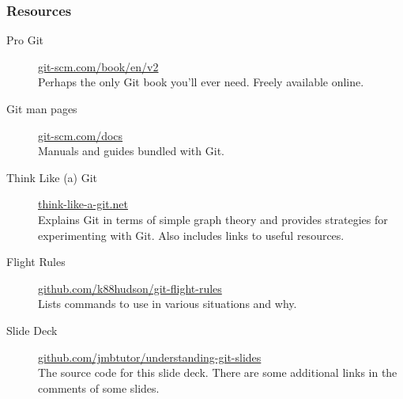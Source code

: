 \documentclass{beamer}
\begin{document}
\begin{frame}
  \frametitle{Resources}
  \begin{description}
    \item[Pro Git] \href{https://git-scm.com/book/en/v2}{git-scm.com/book/en/v2}\\
      Perhaps the only Git book you'll ever need. Freely available online.
    \item[Git man pages] \href{https://git-scm.com/docs}{git-scm.com/docs}\\
      Manuals and guides bundled with Git.
    \item[Think Like (a) Git] \href{http://think-like-a-git.net}{think-like-a-git.net}\\
      Explains Git in terms of simple graph theory and provides strategies for experimenting with Git. Also includes links to useful resources.
    \item[Flight Rules] \href{https://github.com/k88hudson/git-flight-rules}{github.com/k88hudson/git-flight-rules}\\
      Lists commands to use in various situations and why. %
    \item[Slide Deck] \href{https://github.com/jmbtutor/understanding-git-slides}{github.com/jmbtutor/understanding-git-slides}\\
      The source code for this slide deck. There are some additional links in the comments of some slides.
  \end{description}
\end{frame}
\end{document}
